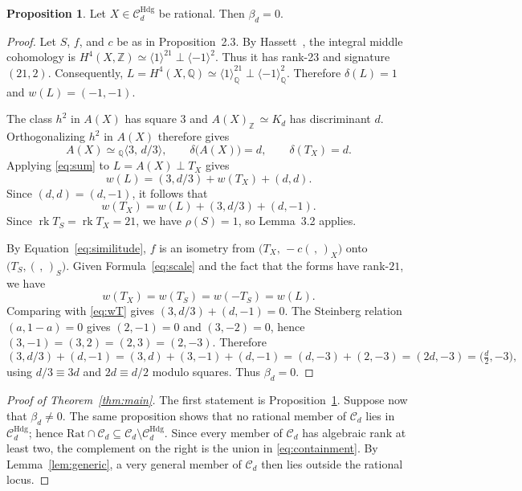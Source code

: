 \documentclass[10pt]{amsart}
\numberwithin{equation}{section}
\theoremstyle{definition}
\newtheorem{proposition}[theorem]{Proposition}
\theoremstyle{plain}
\numberwithin{theorem}{section}
\newcommand{\Q}{\mathbb{Q}}
\newcommand{\Z}{\mathbb{Z}}
\newcommand{\Rat}{\mathrm{Rat}}
\begin{document}
\begin{proposition}\label{prop:hasse}
Let $X\in\mathcal C_d^{\mathrm{Hdg}}$ be rational. Then $\beta_d=0$.
\end{proposition}

\begin{proof}
Let $S$, $f$, and $c$ be as in Proposition~2.3. By Hassett~\citep[\S2]{hassett}, the integral middle cohomology is $H^4(X,\Z)\simeq\langle1\rangle^{21}\perp\langle-1\rangle^{2}$. Thus it has rank-23 and signature $(21,2)$. Consequently, $L=H^4(X,\Q)\simeq\langle1\rangle_\Q^{21}\perp\langle-1\rangle_\Q^{2}$. Therefore $\delta(L)=1$ and $w(L)=(-1,-1)$. 

The class $h^2$ in $A(X)$ has square $3$ and $A(X)_{\Z}\,\simeq K_d$ has discriminant $d$. Orthogonalizing $h^2$ in $A(X)$ therefore gives
\[
A(X)\simeq{_\Q}\langle3,\,d/3\rangle,\qquad \delta\bigl(A(X)\bigr) = d,\qquad \delta(T_X) = d .
\]
Applying \eqref{eq:sum} to $L=A(X)\perp T_X$ gives $$w(L)=(3,d/3)+w(T_X)+(d,d).$$  Since $(d,d)=(d,-1)$, it follows that
\begin{equation}\label{eq:wT}
w(T_X)=w(L)+(3,d/3)+(d,-1).
\end{equation}
Since $\operatorname{rk}T_S=\operatorname{rk}T_X=21$, we have $\rho(S)=1$, so Lemma~3.2 applies. 

By Equation~\eqref{eq:similitude}, $f$ is an isometry from $\bigl(T_X,\,-c(\,{,}\,)_X\bigr)$ onto $\bigl(T_S,(\,{,}\,)_S\bigr)$. Given Formula~\eqref{eq:scale} and the fact that the forms have rank-$21$, we have
\[
w(T_X)=w(T_S)=w(-T_S)=w(L).
\]
Comparing with \eqref{eq:wT} gives $(3,d/3)+(d,-1)=0$. The Steinberg relation $(a,1-a)=0$ gives $(2,-1)=0$ and $(3,-2)=0$, hence $(3,-1)=(3,2)=(2,3)=(2,-3)$. Therefore
\[
(3,d/3)+(d,-1)=(3,d)+(3,-1)+(d,-1)=(d,-3)+(2,-3)=(2d,-3)=\bigl(\tfrac d2,-3\bigr),
\]
using $d/3\equiv3d$ and $2d\equiv d/2$ modulo squares. Thus $\beta_d=0$.
\end{proof}

\begin{proof}[Proof of Theorem~\ref{thm:main}] The first statement is Proposition~\ref{prop:hasse}. Suppose now that $\beta_d\ne0$. The same proposition shows that no rational member of $\mathcal C_d$ lies in $\mathcal C_d^{\mathrm{Hdg}}$; hence $ \Rat\cap\mathcal C_d\subseteq \mathcal C_d\setminus\mathcal C_d^{\mathrm{Hdg}}$. Since every member of $\mathcal C_d$ has algebraic rank at least two, the complement on the right is the union in \eqref{eq:containment}. By Lemma~\ref{lem:generic}, a very general member of $\mathcal C_d$ then lies outside the rational locus. \end{proof}
\end{document}

